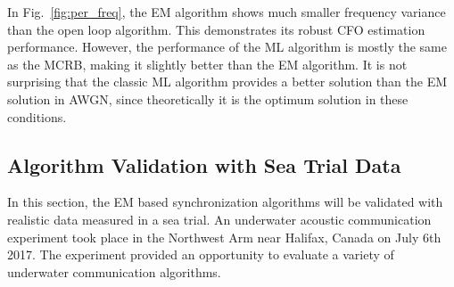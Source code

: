 \documentclass[journal,comsoc, onecolumn, 12pt,draftclsnofoot]{IEEEtran} %
\begin{document}
In Fig.~\ref{fig:per_freq}, the EM algorithm shows much smaller frequency variance than the open loop algorithm. 
This demonstrates its robust CFO estimation performance.
However, the performance of the ML algorithm is mostly the same as the MCRB, making it slightly better than the EM algorithm.
It is not surprising that the classic ML algorithm provides a better solution than the EM solution in AWGN, since theoretically it is the optimum solution in these conditions. 

% 
% 

\subsection{Algorithm Validation with Sea Trial Data }
\label{sec:per_sea}
In this section, the EM based synchronization algorithms will be validated with realistic data measured in a sea trial. 
An underwater acoustic communication experiment took place in the Northwest Arm near Halifax, Canada on July 6th 2017. 
The experiment provided an opportunity to evaluate a variety of underwater communication algorithms.
\end{document}
